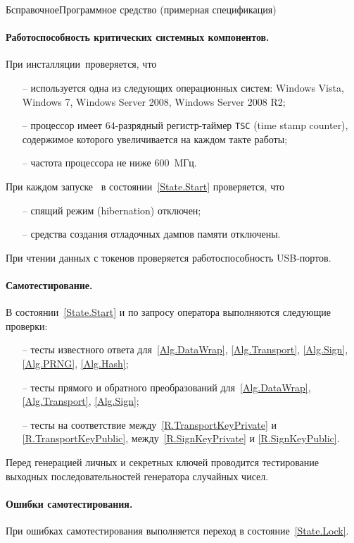 \begin{appendix}{Б}{справочное}{Программное средство \CryptoDisk 
(примерная спецификация)}

\paragraph*{Работоспособность критических системных компонентов.}
При инсталляции~\CryptoDisk проверяется, что
\begin{itemize}
\item[--]
используется одна из следующих операционных систем:
Windows Vista, Windows 7, Windows Server 2008, 
Windows Server 2008 R2;
\item[--]
процессор имеет $64$-разрядный регистр-таймер \texttt{TSC} 
(time stamp counter),
содержимое которого увеличивается на каждом такте работы;
\item[--]
частота процессора не ниже $600$~MГц.
\end{itemize}

При каждом запуске~\CryptoDisk 
в состоянии~\ref{State.Start} проверяется, что
\begin{itemize}
\item[--]
спящий режим (hibernation) отключен;
%
\item[--]
средства создания отладочных дампов памяти отключены.
\end{itemize}

При чтении данных с токенов проверяется работоспособность 
USB-портов.

\paragraph*{Самотестирование.}
В состоянии~\ref{State.Start} и по запросу оператора выполняются следующие проверки:
\begin{itemize}
\item[--]
тесты известного ответа для~\ref{Alg.DataWrap}, \ref{Alg.Transport}, 
\ref{Alg.Sign}, \ref{Alg.PRNG}, \ref{Alg.Hash};
\item[--]
тесты прямого и обратного преобразований для~\ref{Alg.DataWrap}, \ref{Alg.Transport}, 
\ref{Alg.Sign};
\item[--]
тесты на соответствие между~\ref{R.TransportKeyPrivate} и \ref{R.TransportKeyPublic}, 
между~\ref{R.SignKeyPrivate} и \ref{R.SignKeyPublic}. 
\end{itemize}

Перед генерацией личных и секретных ключей проводится тестирование
выходных последовательностей генератора случайных чисел.

\paragraph*{Ошибки самотестирования.}
При ошибках самотестирования выполняется переход в состояние~\ref{State.Lock}.


\end{appendix}
